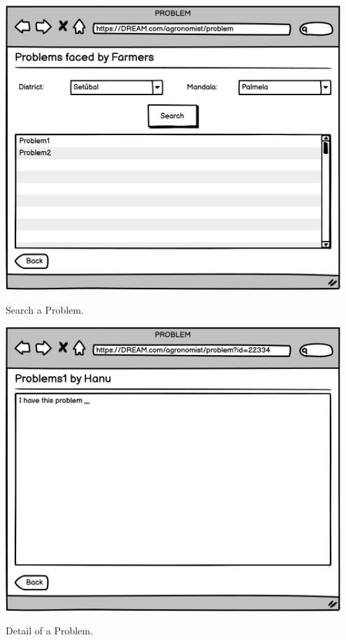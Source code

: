 \begin{minipage}{.5\textwidth}
	\centering
	\includegraphics[width=0.95\textwidth]{Images/Mockup/Agronomist/11AgronomistProblem.png}
	\captionsetup{type=figure}
	\caption{Search a Problem.}
\end{minipage}%
\begin{minipage}{.5\textwidth}
	\centering
	\includegraphics[width=0.95\textwidth]{Images/Mockup/Agronomist/12AgronomistProblem1.png}
	\captionsetup{type=figure}
	\caption{Detail of a Problem.}
\end{minipage}
\vspace{0.5cm}
